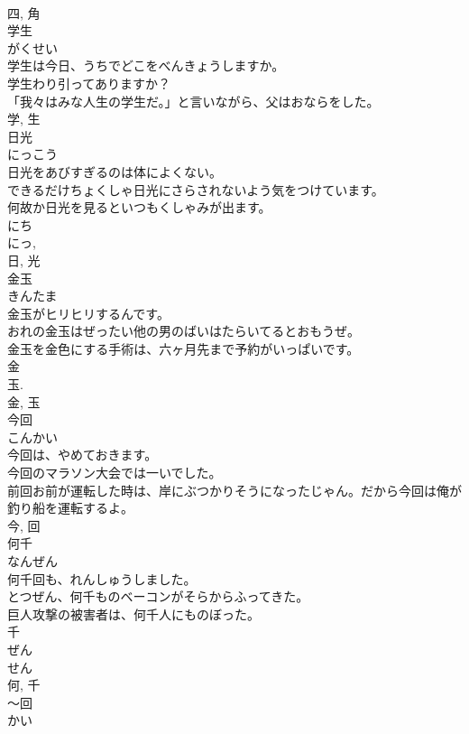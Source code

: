 \documentclass[8pt]{extreport}
\begin{document}
\begin{CJK}{UTF8}{min}
\\	四, 角	
\\	学生	
\\	がくせい	
\\	学生は今日、うちでどこをべんきょうしますか。	
\\	学生わり引ってありますか？	
\\	「我々はみな人生の学生だ。」と言いながら、父はおならをした。	
\\	学, 生	
\\	日光	
\\	にっこう	
\\	日光をあびすぎるのは体によくない。	
\\	できるだけちょくしゃ日光にさらされないよう気をつけています。	
\\	何故か日光を見るといつもくしゃみが出ます。	
\\	にち 
\\	にっ, 
\\	日, 光	
\\	金玉	
\\	きんたま	
\\	金玉がヒリヒリするんです。	
\\	おれの金玉はぜったい他の男のばいはたらいてるとおもうぜ。	
\\	金玉を金色にする手術は、六ヶ月先まで予約がいっぱいです。	
\\	金 
\\	玉. 
\\	金, 玉	
\\	今回	
\\	こんかい	
\\	今回は、やめておきます。	
\\	今回のマラソン大会では一いでした。	
\\	前回お前が運転した時は、岸にぶつかりそうになったじゃん。だから今回は俺が釣り船を運転するよ。	
\\	今, 回	
\\	何千	
\\	なんぜん	
\\	何千回も、れんしゅうしました。	
\\	とつぜん、何千ものベーコンがそらからふってきた。	
\\	巨人攻撃の被害者は、何千人にものぼった。	
\\	千 
\\	ぜん 
\\	せん 
\\	何, 千	
\\	〜回	
\\	かい	

\end{CJK}
\end{document}
